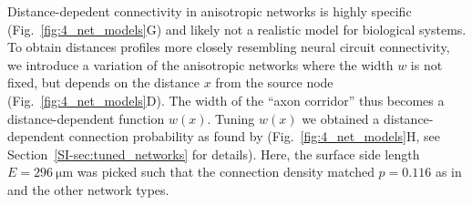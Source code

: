 Distance-depedent connectivity in anisotropic networks is highly
specific (Fig.~\ref{fig:4_net_models}G) and likely not a realistic
model for biological systems. To obtain distances profiles more
closely resembling neural circuit connectivity, we introduce a
variation of the anisotropic networks where the width $w$ is not
fixed, but depends on the distance $x$ from the source node
(Fig.~\ref{fig:4_net_models}D). The width of the \enquote{axon
  corridor} thus becomes a distance-dependent function $w(x)$. Tuning
$w(x)$ we obtained a distance-dependent connection probability as
found by \textcite{Perin2011} (Fig.~\ref{fig:4_net_models}H, see
Section~\ref{SI-sec:tuned_networks} for details). Here, the surface
side length $E=\SI{296}{\micro\meter}$ was picked such that the
connection density matched $p=0.116$ as in \cite{Song2005} and the
other network types.







